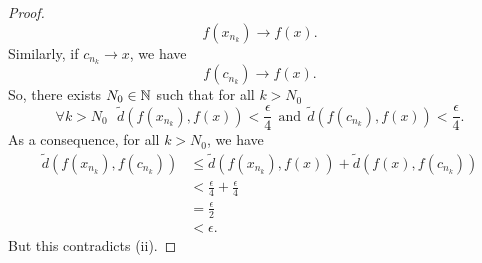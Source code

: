 \documentclass[a4paper]{article}
\begin{document}
\begin{proof}
\[  f({x}_{{n}_{k}}) \to f(x). \tag{1} \]
Similarly, if \( {c}_{{n}_{k}} \to x  \), we have 
\[  f({c}_{{n}_{k}}) \to f(x). \tag{2} \]
So, there exists \( {N}_{0} \in \mathbb{N} \) such that for all \( k > {N}_{0} \) 
\[  \forall k > {N}_{0} \ \ \ \tilde{d}(f({x}_{{n}_{k}}), f(x)) < \frac{ \epsilon }{ 4 }  \ \ \text{and} \ \ \tilde{d}(f({c}_{{n}_{k}}) , f(x)) < \frac{ \epsilon }{ 4 }.  \]
As a consequence, for all \( k > {N}_{0} \), we have
\begin{align*}
    \tilde{d}(f({x}_{{n}_{k}}), f({c}_{{n}_{k}})) &\leq \tilde{d}(f({x}_{{n}_{k}}), f(x)) + \tilde{d}(f(x), f({c}_{{n}_{k}})) \\
                                                  &< \frac{ \epsilon }{ 4 }  + \frac{ \epsilon }{ 4 }  \\
                                                  &= \frac{ \epsilon }{ 2 } \\
                                                  &< \epsilon.
\end{align*}
But this contradicts (ii).
\end{proof}
\end{document}
